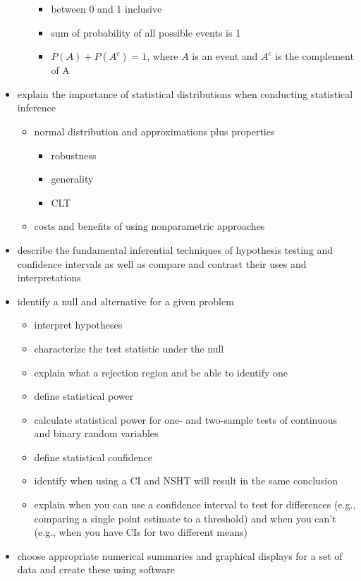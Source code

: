 \documentclass[]{book}
\providecommand{\tightlist}{%
  \setlength{\itemsep}{0pt}\setlength{\parskip}{0pt}}
\begin{document}
\begin{itemize}
\begin{itemize}
    \begin{itemize}
    \tightlist
    \item
      between 0 and 1 inclusive
    \item
      sum of probability of all possible events is 1
    \item
      \(P(A) + P(A^c) = 1\), where \(A\) is an event and \(A^c\) is the
      complement of A
    \end{itemize}
  \end{itemize}
\item
  explain the importance of statistical distributions when conducting
  statistical inference

  \begin{itemize}
  \tightlist
  \item
    normal distribution and approximations plus properties

    \begin{itemize}
    \tightlist
    \item
      robustness
    \item
      generality
    \item
      CLT
    \end{itemize}
  \item
    costs and benefits of using nonparametric approaches
  \end{itemize}
\item
  describe the fundamental inferential techniques of hypothesis testing
  and confidence intervals as well as compare and contrast their uses
  and interpretations
\item
  identify a null and alternative for a given problem

  \begin{itemize}
  \tightlist
  \item
    interpret hypotheses
  \item
    characterize the test statistic under the null
  \item
    explain what a rejection region and be able to identify one
  \item
    define statistical power
  \item
    calculate statistical power for one- and two-sample tests of
    continuous and binary random variables
  \item
    define statistical confidence\\
  \item
    identify when using a CI and NSHT will result in the same conclusion
  \item
    explain when you can use a confidence interval to test for
    differences (e.g., comparing a single point estimate to a threshold)
    and when you can't (e.g., when you have CIs for two different means)
  \end{itemize}
\item
  choose appropriate numerical summaries and graphical displays for a
  set of data and create these using software


\end{itemize}
\end{document}
